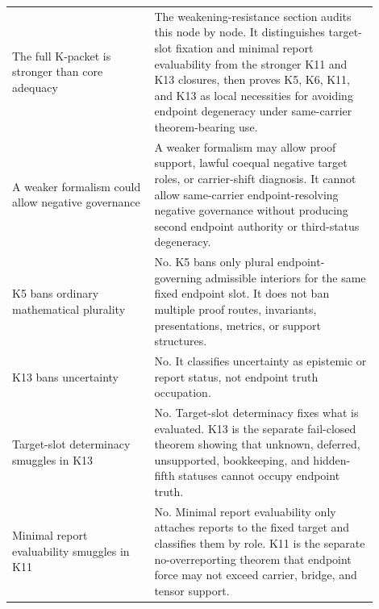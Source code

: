 \documentclass[11pt]{article}
\begin{document}
\begin{longtable}{L{0.35\linewidth}L{0.55\linewidth}}
The full K-packet is stronger than core adequacy & The weakening-resistance section audits this node by node. It distinguishes target-slot fixation and minimal report evaluability from the stronger K11 and K13 closures, then proves K5, K6, K11, and K13 as local necessities for avoiding endpoint degeneracy under same-carrier theorem-bearing use.\\
A weaker formalism could allow negative governance & A weaker formalism may allow proof support, lawful coequal negative target roles, or carrier-shift diagnosis. It cannot allow same-carrier endpoint-resolving negative governance without producing second endpoint authority or third-status degeneracy.\\
K5 bans ordinary mathematical plurality & No. K5 bans only plural endpoint-governing admissible interiors for the same fixed endpoint slot. It does not ban multiple proof routes, invariants, presentations, metrics, or support structures.\\
K13 bans uncertainty & No. It classifies uncertainty as epistemic or report status, not endpoint truth occupation.\\
Target-slot determinacy smuggles in K13 & No. Target-slot determinacy fixes what is evaluated. K13 is the separate fail-closed theorem showing that unknown, deferred, unsupported, bookkeeping, and hidden-fifth statuses cannot occupy endpoint truth.\\
Minimal report evaluability smuggles in K11 & No. Minimal report evaluability only attaches reports to the fixed target and classifies them by role. K11 is the separate no-overreporting theorem that endpoint force may not exceed carrier, bridge, and tensor support.\\
\bottomrule
\end{longtable}
\end{document}
